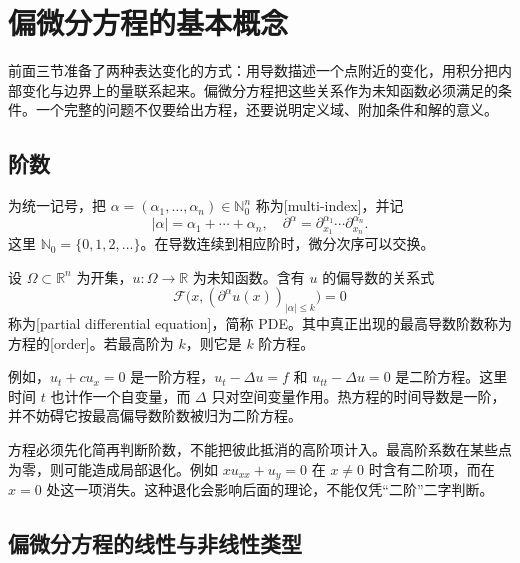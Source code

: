 \section{偏微分方程的基本概念}
\label{b2:sec:0104}

前面三节准备了两种表达变化的方式：用导数描述一个点附近的变化，用积分把内部变化与边界上的量联系起来。偏微分方程把这些关系作为未知函数必须满足的条件。一个完整的问题不仅要给出方程，还要说明定义域、附加条件和解的意义。

\subsection{阶数}
\label{b2:subsec:010401}

为统一记号，把 \(\alpha=(\alpha_1,\ldots,\alpha_n)\in\mathbb N_0^n\) 称为[multi-index]，并记
\[
|\alpha|=\alpha_1+\cdots+\alpha_n,
\quad
\partial^\alpha=\partial_{x_1}^{\alpha_1}\cdots\partial_{x_n}^{\alpha_n}.
\]
这里 \(\mathbb N_0=\{0,1,2,\ldots\}\)。在导数连续到相应阶时，微分次序可以交换。

\begin{definition}\label{b2:def:01-pde-order}
设 \(\Omega\subset\mathbb R^n\) 为开集，\(u:\Omega\to\mathbb R\) 为未知函数。含有 \(u\) 的偏导数的关系式
\[
\mathcal F\bigl(x,(\partial^\alpha u(x))_{|\alpha|\leq k}\bigr)=0
\]
称为[partial differential equation]，简称 PDE。其中真正出现的最高导数阶数称为方程的[order]。若最高阶为 \(k\)，则它是 \(k\) 阶方程。
\end{definition}

例如，\(u_t+c u_x=0\) 是一阶方程，\(u_t-\Delta u=f\) 和 \(u_{tt}-\Delta u=0\) 是二阶方程。这里时间 \(t\) 也计作一个自变量，而 \(\Delta\) 只对空间变量作用。热方程的时间导数是一阶，并不妨碍它按最高偏导数阶数被归为二阶方程。

\ProseParagraphBreak

方程必须先化简再判断阶数，不能把彼此抵消的高阶项计入。最高阶系数在某些点为零，则可能造成局部退化。例如 \(xu_{xx}+u_y=0\) 在 \(x\neq0\) 时含有二阶项，而在 \(x=0\) 处这一项消失。这种退化会影响后面的理论，不能仅凭“二阶”二字判断。

\subsection{偏微分方程的线性与非线性类型}
\label{b2:subsec:010402}

